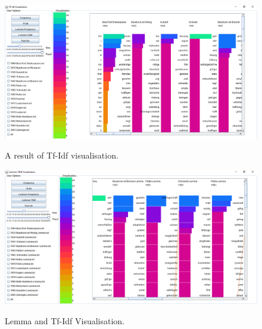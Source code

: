 \begin{figure}[H]
	\centering	
	\includegraphics[scale=0.5]{Figs/Tf-Idf}\\[1ex]
	\caption{A result of Tf-Idf visualisation.}
	\label{fig:tfIdfView}
\end{figure} 
\begin{figure}[H]
	\centering	
	\includegraphics[scale=0.5]{Figs/Lemma-TfIdf}\\[1ex]
	\caption{Lemma and Tf-Idf Visualisation.}
	\label{fig:tfIdfLemma}
\end{figure} 


